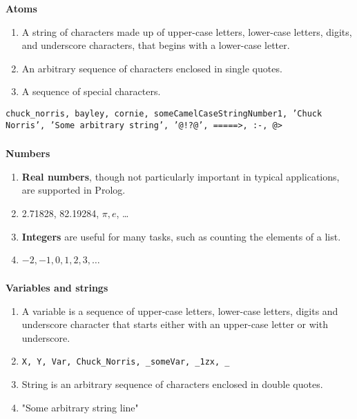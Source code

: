 \begin{frame}
	\frametitle{\insertsection}
	\textbf{Atoms}
	\begin{enumerate}
		\item A string of characters made up of upper-case letters, lower-case letters, digits, and underscore characters,
		that begins with a lower-case letter.
		\item An arbitrary sequence of characters enclosed in single quotes.
		\item A sequence of special characters.
	\end{enumerate}

	\begin{example}
		\texttt{chuck\_norris, bayley, cornie, someCamelCaseStringNumber1, 'Chuck Norris', 'Some arbitrary string', '@!?@',
		=====>, :-, @>}
	\end{example}
\end{frame}

\begin{frame}
	\frametitle{\insertsection}
	\textbf{Numbers}
	\begin{enumerate}
		\item \textbf{Real numbers}, though not particularly important in typical applications, are supported in Prolog.
		\item[] \begin{example}
			2.71828, 82.19284, \(\pi, e \), \ldots
		\end{example}
		\item \textbf{Integers} are useful for many tasks, such as counting the elements of a list.
		\item[] \begin{example}
			\(-2, -1, 0, 1, 2, 3, \ldots \)
		\end{example}
	\end{enumerate}
\end{frame}

\begin{frame}
	\frametitle{\insertsection}
	\textbf{Variables and strings}
	\begin{enumerate}
		\item A variable is a sequence of upper-case letters, lower-case letters, digits and underscore character
		that starts either with an upper-case letter or with underscore.
		\item[] \begin{example}
			\texttt{X, Y, Var, Chuck\_Norris, \_someVar, \_1zx, \_}
		\end{example}
		\item String is an arbitrary sequence of characters enclosed in double quotes.
		\item[] \begin{example}
			"Some arbitrary string line"
		\end{example}
	\end{enumerate}
\end{frame}

